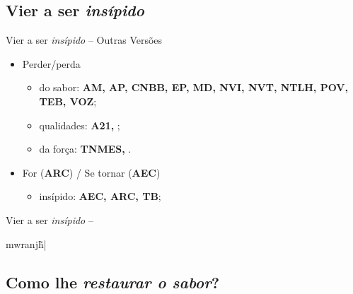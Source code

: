 \documentclass[12pt,aspectratio=169]{beamer}
\newcommand{\YEL}[1]{{\textcolor{TXyel}{#1}}}
\newcommand{\BRI}[1]{{\textcolor{BSpbg}{#1}}}   %
\newcommand{\GRtxt}[1]{\begin{otherlanguage}{greek}{{#1}}\end{otherlanguage}}
\begin{document}
    \subsection{Vier a ser \textit{insípido\/}}

    \begin{frame}{\BRI{Vier a ser \YEL{\textit{insípido\/}} -- Outras Versões}}
        \begin{itemize}
            \item<1-> \YEL{Perder/perda}
                \begin{itemize}
                    \item<1-> \YEL{do sabor}: \BRI{\textbf{AM, AP, CNBB, EP, MD, NVI, NVT, NTLH, POV, TEB, VOZ}};
                    \item<2-> \YEL{qualidades}: \BRI{\textbf{A21, }};
                    \item<3-> \YEL{da força}: \BRI{\textbf{TNMES, }}.
                \end{itemize}
            \item<3-> \YEL{For} (\BRI{\bf ARC}) / \YEL{Se tornar} (\BRI{\bf AEC})
                \begin{itemize}
                    \item<1-> \YEL{insípido}: \BRI{\textbf{AEC, ARC, TB}};
                \end{itemize}
        \end{itemize}
    \end{frame}

    \begin{frame}{\BRI{Vier a ser \YEL{\textit{insípido\/}} -- \GRtxt{mwranj\~h|}}}
    \end{frame}

    \subsection{Como lhe \textit{restaurar o sabor\/}?}
\end{document}
